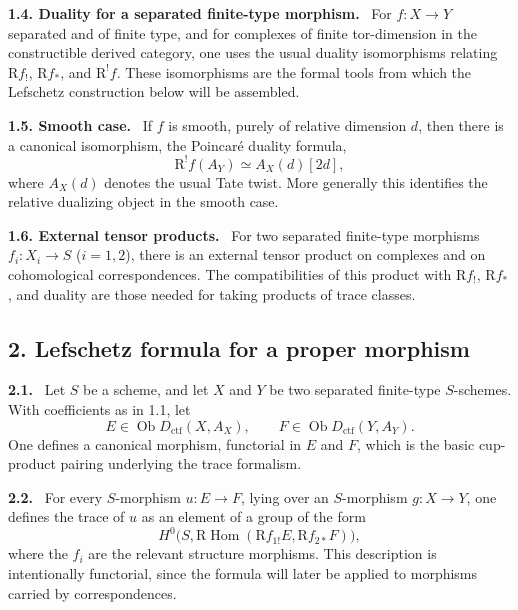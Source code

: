 \documentclass[11pt]{article}
\theoremstyle{plain}
\theoremstyle{definition}
\theoremstyle{remark}
\newenvironment{statement}[1]{\par\medskip\noindent\textbf{#1.}\ }{\par\medskip}
\DeclareMathOperator{\Hom}{Hom}
\DeclareMathOperator{\ob}{Ob}
\newcommand{\R}{\mathrm R}
\begin{document}
\begin{statement}{1.4. Duality for a separated finite-type morphism}
For $f:X\to Y$ separated and of finite type, and for complexes of finite tor-dimension in the constructible derived category, one uses the usual duality isomorphisms relating $\R f_!$, $\R f_*$, and $\R^!f$. These isomorphisms are the formal tools from which the Lefschetz construction below will be assembled.
\end{statement}

\begin{statement}{1.5. Smooth case}
If $f$ is smooth, purely of relative dimension $d$, then there is a canonical isomorphism, the Poincaré duality formula,
\[
   \R^!f(A_Y)\simeq A_X(d)[2d],
\]
where $A_X(d)$ denotes the usual Tate twist. More generally this identifies the relative dualizing object in the smooth case.
\end{statement}

\begin{statement}{1.6. External tensor products}
For two separated finite-type morphisms $f_i:X_i\to S$ ($i=1,2$), there is an external tensor product on complexes and on cohomological correspondences. The compatibilities of this product with $\R f_!$, $\R f_*$, and duality are those needed for taking products of trace classes.
\end{statement}

\subsection*{2. Lefschetz formula for a proper morphism}

\begin{statement}{2.1}
Let $S$ be a scheme, and let $X$ and $Y$ be two separated finite-type $S$-schemes. With coefficients as in 1.1, let
\[
   E\in\ob D_{\mathrm{ctf}}(X,A_X),
   \qquad F\in\ob D_{\mathrm{ctf}}(Y,A_Y).
\]
One defines a canonical morphism, functorial in $E$ and $F$, which is the basic cup-product pairing underlying the trace formalism.
\end{statement}

\begin{statement}{2.2}
For every $S$-morphism $u:E\to F$, lying over an $S$-morphism $g:X\to Y$, one defines the trace of $u$ as an element of a group of the form
\[
   H^0\bigl(S,\R\Hom(\R f_{1!}E,\R f_{2*}F)\bigr),
\]
where the $f_i$ are the relevant structure morphisms. This description is intentionally functorial, since the formula will later be applied to morphisms carried by correspondences.
\end{statement}
\end{document}
